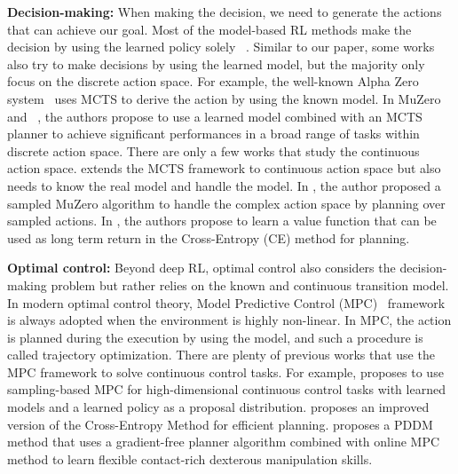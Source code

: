 \documentclass{article} %
\newcommand{\lijun}[1]{ {#1}}
\newcommand{\yue}[1]{ {#1}}
\begin{document}
\textbf{Decision-making:}
When making the decision, we need to generate the actions that can achieve our goal. Most of the model-based RL methods make the decision by using the learned policy solely ~\citep{janner_when_2019,yu2020mopo,clavera_model-augmented_2019, hafner2021mastering}. 
Similar to our paper, some works also try to make decisions by using the learned model, but the majority  only focus on the discrete action space.
For example, the well-known Alpha Zero system~\citep{silver2017mastering} uses MCTS to derive the action by using the known model. In MuZero and  ~\citep{schrittwieser2020mastering}, the authors propose to use a learned model combined with an MCTS planner to achieve significant performances in a broad range of tasks within discrete action space.
There are only a few works that study   the continuous action space.
\cite{couetoux2011continuous} extends the MCTS framework to continuous action space but also needs to know  the real model and handle the model. 
In \cite{hubert2021learning}, the author proposed a sampled MuZero algorithm to handle the complex action space by planning over sampled actions.
In \cite{hansen2022temporal}, the authors propose to learn a value function that can be used as long term return in the Cross-Entropy (CE) method for planning.



\textbf{Optimal control:}
Beyond deep RL, optimal control also considers the decision-making problem but rather relies on the known and continuous transition model. 
In modern optimal control theory, Model Predictive Control (MPC)~\citep{camacho2013model} framework is always adopted when the environment is highly non-linear. In MPC, the action is planned during the execution by using the model, and such a procedure is called  trajectory optimization. \yue{There are plenty of previous works that use the MPC framework to solve continuous control tasks. For example, \cite{byravan2021evaluating} proposes to use sampling-based MPC for high-dimensional continuous control tasks with learned models and a learned policy as a proposal distribution. \cite{pinneri2021sample} proposes an improved version of the Cross-Entropy Method for efficient planning. \cite{nagabandi2020deep} proposes a PDDM method that uses a gradient-free planner algorithm combined with online MPC method to learn flexible contact-rich dexterous manipulation skills.}
\end{document}

